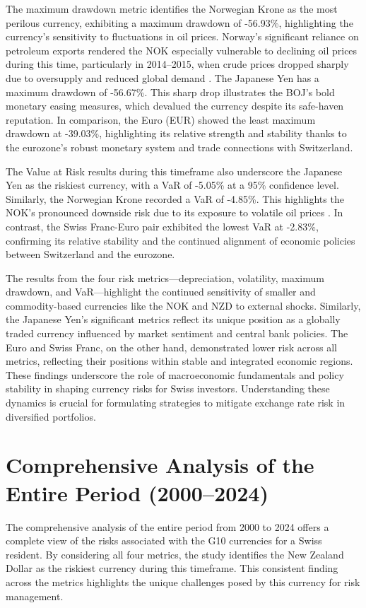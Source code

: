 \documentclass[11pt,a4paper,english,oneside]{book}
\begin{document}
The maximum drawdown metric identifies the Norwegian Krone as the most perilous currency, exhibiting a maximum drawdown of -56.93\%, highlighting the currency’s sensitivity to fluctuations in oil prices. Norway's significant reliance on petroleum exports rendered the NOK especially vulnerable to declining oil prices during this time, particularly in 2014–2015, when crude prices dropped sharply due to oversupply and reduced global demand \parencite{bergholt2016business}. The Japanese Yen has a maximum drawdown of -56.67\%. This sharp drop illustrates the BOJ's bold monetary easing measures, which devalued the currency despite its safe-haven reputation. In comparison, the Euro (EUR) showed the least maximum drawdown at -39.03\%, highlighting its relative strength and stability thanks to the eurozone's robust monetary system and trade connections with Switzerland.

The Value at Risk results during this timeframe also underscore the Japanese Yen as the riskiest currency, with a VaR of -5.05\% at a 95\% confidence level. Similarly, the Norwegian Krone recorded a VaR of -4.85\%. This highlights the NOK's pronounced downside risk due to its exposure to volatile oil prices \parencite{bergholt2016business}. In contrast, the Swiss Franc-Euro pair exhibited the lowest VaR at -2.83\%, confirming its relative stability and the continued alignment of economic policies between Switzerland and the eurozone.

The results from the four risk metrics—depreciation, volatility, maximum drawdown, and VaR—highlight the continued sensitivity of smaller and commodity-based currencies like the NOK and NZD to external shocks. Similarly, the Japanese Yen's significant metrics reflect its unique position as a globally traded currency influenced by market sentiment and central bank policies. The Euro and Swiss Franc, on the other hand, demonstrated lower risk across all metrics, reflecting their positions within stable and integrated economic regions. These findings underscore the role of macroeconomic fundamentals and policy stability in shaping currency risks for Swiss investors. Understanding these dynamics is crucial for formulating strategies to mitigate exchange rate risk in diversified portfolios.

\section{Comprehensive Analysis of the Entire Period (2000–2024)}
The comprehensive analysis of the entire period from 2000 to 2024 offers a complete view of the risks associated with the G10 currencies for a Swiss resident. By considering all four metrics, the study identifies the New Zealand Dollar as the riskiest currency during this timeframe. This consistent finding across the metrics highlights the unique challenges posed by this currency for risk management.
\end{document}
